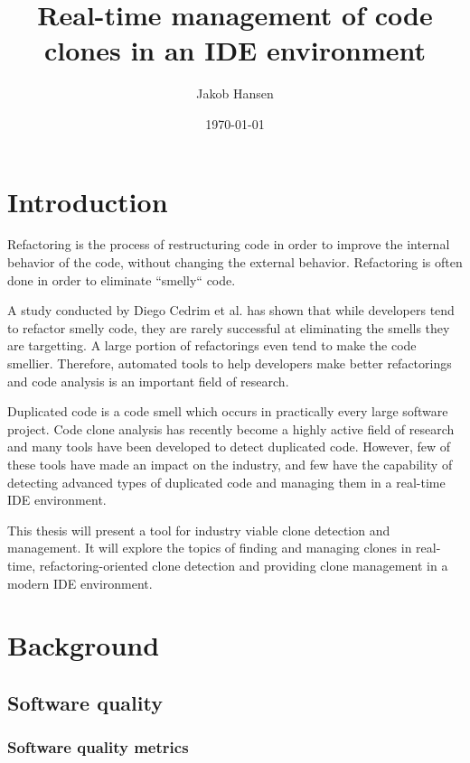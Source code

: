 \documentclass[12pt]{article}
\title{\vspace{-20px}Real-time management of code clones in an IDE environment}
\author{Jakob Hansen}
\date{\today}
\begin{document}
\maketitle

\tableofcontents

\section{Introduction}

Refactoring is the process of restructuring code in order to improve the internal behavior
of the code, without changing the external behavior.\cite[9]{fowlerrefactoring} Refactoring
is often done in order to eliminate ``smelly`` code.

A study conducted by Diego Cedrim et al.\cite{Rohit_Gheyi_Impact} has shown that while
developers tend to refactor smelly code, they are rarely successful at eliminating the
smells they are targetting. A large portion of refactorings even tend to make the code
smellier. Therefore, automated tools to help developers make better refactorings and code
analysis is an important field of research.

Duplicated code is a code smell which occurs in practically every large software project.
Code clone analysis has recently become a highly active field of research and many tools have
been developed to detect duplicated code.\cite[7]{Inoue_introduction_to_cc} However, few of
these tools have made an impact on the industry, and few have the capability of detecting
advanced types of duplicated code and managing them in a real-time IDE environment. 

This thesis will present a tool for industry viable clone detection and management. It
will explore the topics of finding and managing clones in real-time, refactoring-oriented
clone detection and providing clone management in a modern IDE environment.


\section{Background}

\subsection{Software quality}

\subsubsection{Software quality metrics}
\end{document}
